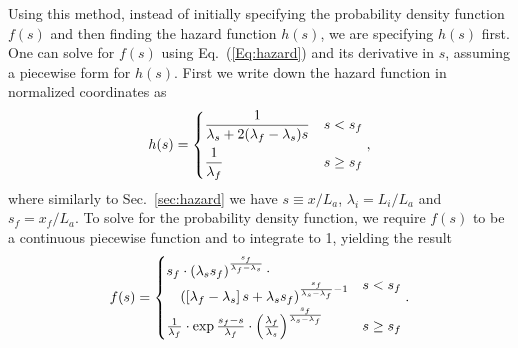 \documentclass[../absorber.tex]{subfiles}
\begin{document}

Using this method, instead of initially specifying the probability density function $f(s)$ and then finding the hazard function $h(s)$, we are specifying $h(s)$ first.  One can solve for $f(s)$ using Eq.~(\ref{Eq:hazard}) and its derivative in $s$, assuming a piecewise form for $h(s)$.  First we write down the hazard function in normalized coordinates as
\begin{equation} \label{Eq:haz_lin}
    h(s) = \begin{dcases} 
      \frac{1}{\lambda_s + 2(\lambda_f-\lambda_s)s} & s < s_f \\
      \frac{1}{\lambda_f} & s \geq s_f
   \end{dcases},
\end{equation}
where similarly to Sec.~\ref{sec:hazard} we have $s\equiv x/L_a$, $\lambda_i = L_i/L_a$ and $s_f=x_f/L_a$.  To solve for the probability density function, we require $f(s)$ to be a continuous piecewise function and to integrate to 1, yielding the result
\begin{equation} \label{Eq:f_lin}
f(s) = \left\{ \def\arraystretch{1.4} \begin{array}{@{}l@{\quad}l@{}}
      s_f \cdot \left( \lambda_s s_f \right)^{\frac{s_f}{\lambda_f-\lambda_s}} \cdot & \\
      \quad \left( \left[ \lambda_f-\lambda_s \right]s + \lambda_s s_f \right)^{\frac{s_f}{\lambda_s-\lambda_f} - 1} & \smash{\raisebox{.7\normalbaselineskip}{$s<s_f$}}  \\
      \frac{1}{\lambda_f} \cdot \exp{\frac{s_f-s}{\lambda_f}} \cdot \left(\frac{\lambda_f}{\lambda_s}\right)^{\frac{s_f}{\lambda_s-\lambda_f}} & s\geq s_f \\
    \end{array} \right. .
\end{equation}
\end{document}
